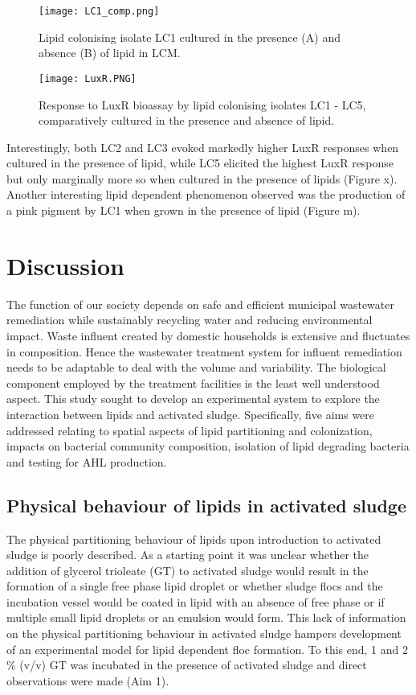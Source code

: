 \documentclass[twoside]{article}
\begin{document}
\begin{figure}
\texttt{[image: LC1\_comp.png]}
\caption{Lipid colonising isolate LC1 cultured in the presence (A) and absence (B) of lipid in LCM.}
\end{figure}

\begin{figure}
\texttt{[image: LuxR.PNG]}
\caption{Response to LuxR bioassay by lipid colonising isolates LC1 - LC5, comparatively cultured in the presence and absence of lipid.}
\end{figure}

Interestingly, both LC2 and LC3 evoked markedly higher LuxR responses when cultured in the presence of lipid, while LC5 elicited the highest LuxR response but only marginally more so when cultured in the presence of lipids (Figure x). Another interesting lipid dependent phenomenon observed was the production of a pink pigment by LC1 when grown in the presence of lipid (Figure m).
\FloatBarrier    
 

\newpage
\section{Discussion}
\thispagestyle{plain}
The function of our society depends on safe and efficient municipal wastewater remediation while sustainably recycling water and reducing environmental impact. Waste influent created by domestic households is extensive and fluctuates in composition. Hence the wastewater treatment system for influent remediation needs to be adaptable to deal with the volume and variability. The biological component employed by the treatment facilities is the least well understood aspect. This study sought to develop an experimental system to explore the interaction between lipids and activated sludge. Specifically, five aims were addressed relating to spatial aspects of lipid partitioning and colonization, impacts on bacterial community composition, isolation of lipid degrading bacteria and testing for AHL production.

\subsection{Physical behaviour of lipids in activated sludge}
The physical partitioning behaviour of lipids upon introduction to activated sludge is poorly described. As a starting point it was unclear whether the addition of glycerol trioleate (GT) to activated sludge would result in the formation of a single free phase lipid droplet or whether sludge flocs and the incubation vessel would be coated in lipid with an absence of free phase or if multiple small lipid droplets or an emulsion would form. This lack of information on the physical partitioning behaviour in activated sludge hampers development of an experimental model for lipid dependent floc formation. To this end, 1 and 2 \% (v/v) GT was incubated in the presence of activated sludge and direct observations were made (Aim 1). \\
\end{document}
